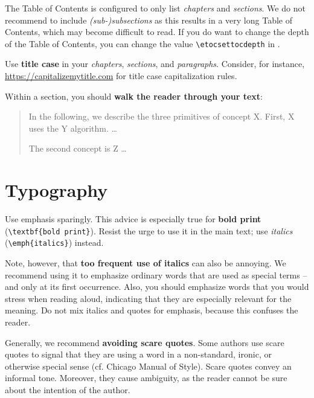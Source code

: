 The Table of Contents is configured to only list \emph{chapters} and \emph{sections}. We do not recommend to include \emph{(sub-)subsections} as this results in a very long Table of Contents, which may become difficult to read. If you do want to change the depth of the Table of Contents, you can change the value \verb|\etocsettocdepth| in .

Use \textbf{title case} in your \emph{chapters}, \emph{sections}, and \emph{paragraphs}. Consider, for instance, \url{https://capitalizemytitle.com} for title case capitalization rules.

Within a section, you should \textbf{walk the reader through your text}:
\begin{quote}
In the following, we describe the three primitives of concept X. First, X uses the Y algorithm. …

The second concept is Z …
\end{quote}

\section{Typography}

Use emphasis sparingly. This advice is especially true for \textbf{bold print} (\verb|\textbf{bold print}|).%
Resist the urge to use it in the main text; use \emph{italics} (\verb|\emph{italics}|) instead.

Note, however, that \textbf{too frequent use of italics} can also be annoying.
We recommend using it to emphasize ordinary words that are used as special terms – and only at its first occurrence. Also, you should emphasize words that you would stress when reading aloud, indicating that they are especially relevant for the meaning. Do not mix italics and quotes for emphasis, because this confuses the reader.


Generally, we recommend \textbf{avoiding scare quotes}.%
Some authors use scare quotes to signal that they are using a word in a non-standard, ironic, or otherwise special sense (cf. Chicago Manual of Style). Scare quotes convey an informal tone. Moreover, they cause ambiguity, as the reader cannot be sure about the intention of the author.

